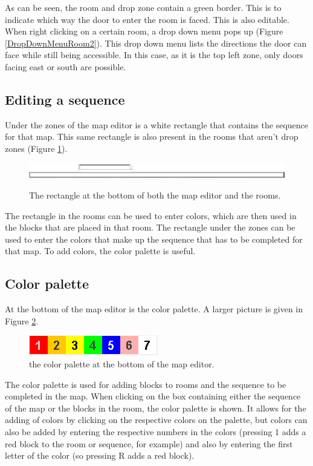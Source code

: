 As can be seen, the room and drop zone contain a green border. This is to indicate which way the door to enter the room is faced. This is also editable. When right clicking on a certain room, a drop down menu pops up (Figure \ref{DropDownMenuRoom2}). This drop down menu lists the directions the door can face while still being accessible. In this case, as it is the top left zone, only doors facing east or south are possible.




\subsection{Editing a sequence}
Under the zones of the map editor is a white rectangle that contains the sequence for that map. This same rectangle is also present in the rooms that aren't drop zones (Figure \ref{fig:SequenceEditor}).

\begin{figure}
	\center
	\includegraphics[scale=0.5]{EnvironmentStore/SequenceEditor.png}\\
	\caption{The rectangle at the bottom of both the map editor and the rooms.}\label{fig:SequenceEditor}
\end{figure}

The rectangle in the rooms can be used to enter colors, which are then used in the blocks that are placed in that room. The rectangle under the zones can be used to enter the colors that make up the sequence that has to be completed for that map. To add colors, the color palette is useful.
\subsection{Color palette}
At the bottom of the map editor is the color palette. A larger picture is given in Figure \ref{fig:ColorPalette}.

\begin{figure}[h!]
	\center
	\includegraphics{EnvironmentStore/ColorPalette.png}
	\caption{the color palette at the bottom of the map editor.}
	\label{fig:ColorPalette}
\end{figure}

The color palette is used for adding blocks to rooms and the sequence to be completed in the map. When clicking on the box containing either the sequence of the map or the blocks in the room, the color palette is shown. It allows for the adding of colors by clicking on the respective colors on the palette, but colors can also be added by entering the respective numbers in the colors (pressing 1 adds a red block to the room or sequence, for example) and also by entering the first letter of the color (so pressing R adds a red block).
